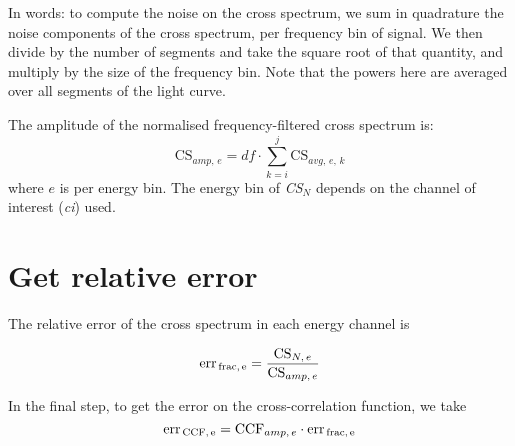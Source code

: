 \documentclass[11pt, oneside, reqno, a4paper]{article}
\newcommand{\be}{\begin{equation}}
\newcommand{\ee}{\end{equation}}
\theoremstyle{plain}
\numberwithin{equation}{section}
\begin{document}
In words: 
to compute the noise on the cross spectrum, we sum in quadrature the noise components of the cross spectrum, per frequency bin of signal. We then divide by the number of segments and take the square root of that quantity, and multiply by the size of the frequency bin. Note that the powers here are averaged over all segments of the light curve.

The amplitude of the normalised frequency-filtered cross spectrum is:
\be
\text{CS}_{amp,\,e} =  df \cdot \sum^j_{k=i} \text{CS}_{avg,\,e,\,k}
\ee
where $e$ is per energy bin. The energy bin of \textit{CS}$_N$ depends on the channel of interest (\textit{ci}) used.

\section{Get relative error}
The relative error of the cross spectrum in each energy channel is 

\be
\text{err}_\text{\,frac,\,e} = \frac{\text{CS}_{N,\,e}}{\text{CS}_{amp,\,e}}
\ee

In the final step, to get the error on the cross-correlation function, we take 
\be
\text{err}_\text{\,CCF,\,e} = \text{CCF}_{amp,\,e} \cdot \text{err}_\text{\,frac,\,e}
\ee
\end{document}
